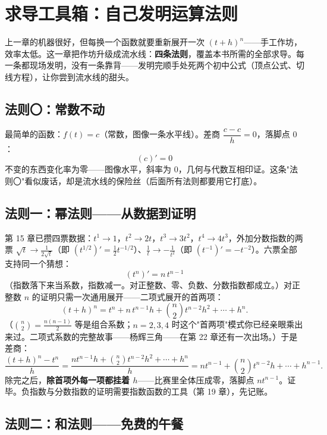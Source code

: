 \chapter{求导工具箱：自己发明运算法则}

上一章的机器很好，但每换一个函数就要重新展开一次 $(t+h)^n$——手工作坊，效率太低。这一章把作坊升级成流水线：\textbf{四条法则}，覆盖本书所需的全部求导。每一条都现场发明，没有一条靠背——发明完顺手处死两个初中公式（顶点公式、切线方程），让你尝到流水线的甜头。

\section{法则〇：常数不动}

最简单的函数：$f(t) = c$（常数，图像一条水平线）。差商 $\dfrac{c - c}{h} = 0$，落脚点 $0$：
\[
\boxed{\;(c)' = 0\;}
\]
不变的东西变化率为零——图像水平，斜率为 $0$，几何与代数互相印证。这条"法则〇"看似废话，却是流水线的保险丝（后面所有法则都要用它打底）。

\section{法则一：幂法则——从数据到证明}

第 15 章已攒四票数据：$t^1\to1$，$t^2\to2t$，$t^3\to3t^2$，$t^4\to4t^3$，外加分数指数的两票 $\sqrt t\to\tfrac1{2\sqrt t}$（即 $(t^{1/2})' = \tfrac12t^{-1/2}$）、$\tfrac1t\to-\tfrac1{t^2}$（即 $(t^{-1})' = -t^{-2}$）。六票全部支持同一个猜想：
\[
\boxed{\;(t^n)' = n\,t^{n-1}\;}
\]
（指数落下来当系数，指数减一。对正整数、零、负数、分数指数都成立。）对正整数 $n$ 的证明只需一次通用展开——二项式展开的首两项：
\[
(t+h)^n = t^n + n\,t^{n-1}h + \binom{n}{2}t^{n-2}h^2 + \cdots + h^n .
\]
（$\binom n2 = \tfrac{n(n-1)}2$ 等是组合系数；$n = 2, 3, 4$ 时这个"首两项"模式你已经亲眼乘出来过。二项式系数的完整故事——杨辉三角——在第 22 章还有一次出场。）于是差商：
\[
\frac{(t+h)^n - t^n}{h} = \frac{n t^{n-1}h + \binom n2 t^{n-2}h^2 + \cdots + h^n}{h} = n t^{n-1} + \binom n2 t^{n-2}h + \cdots + h^{n-1} .
\]
除完之后，\textbf{除首项外每一项都挂着 $h$}——比赛里全体压成零，落脚点 $n t^{n-1}$。证毕。负指数与分数指数的证明需要指数函数的工具（第 19 章），先记账。

\section{法则二：和法则——免费的午餐}

